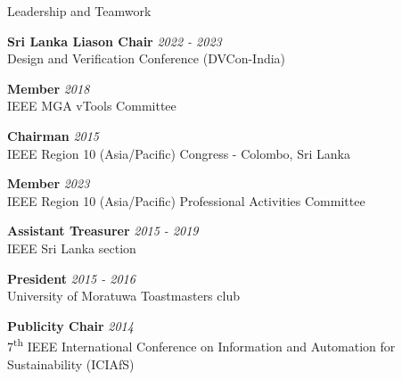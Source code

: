 \documentclass[
11pt, %
]{./../assets/resume} %
\begin{document}
\begin{rSection}{Leadership and Teamwork}

\textbf{Sri Lanka Liason Chair} \hfill \textit{2022 - 2023} \\
Design and Verification Conference (DVCon-India)


\textbf{Member} \hfill \textit{2018} \\
IEEE MGA vTools Committee


\textbf{Chairman} \hfill \textit{2015} \\
IEEE Region 10 (Asia/Pacific) Congress - Colombo, Sri Lanka


\textbf{Member} \hfill \textit{2023} \\
IEEE Region 10 (Asia/Pacific) Professional Activities Committee

\textbf{Assistant Treasurer} \hfill \textit{2015 - 2019}\\
IEEE Sri Lanka section

\textbf{President} \hfill \textit{2015 - 2016} \\
University of Moratuwa Toastmasters club

\textbf{Publicity Chair} \hfill \textit{2014} \\
7\textsuperscript{th} IEEE International Conference on Information and Automation for Sustainability (ICIAfS)

\end{rSection}
\end{document}
